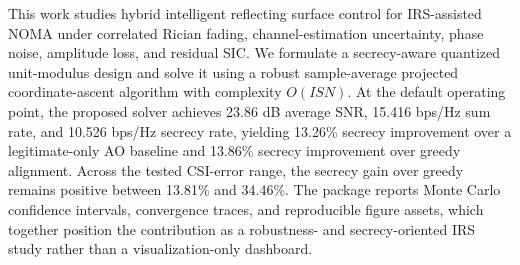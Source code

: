 This work studies hybrid intelligent reflecting surface control for IRS-assisted NOMA under correlated Rician fading, channel-estimation uncertainty, phase noise, amplitude loss, and residual SIC. We formulate a secrecy-aware quantized unit-modulus design and solve it using a robust sample-average projected coordinate-ascent algorithm with complexity $O(ISN)$. At the default operating point, the proposed solver achieves 23.86 dB average SNR, 15.416 bps/Hz sum rate, and 10.526 bps/Hz secrecy rate, yielding 13.26\% secrecy improvement over a legitimate-only AO baseline and 13.86\% secrecy improvement over greedy alignment. Across the tested CSI-error range, the secrecy gain over greedy remains positive between 13.81\% and 34.46\%. The package reports Monte Carlo confidence intervals, convergence traces, and reproducible figure assets, which together position the contribution as a robustness- and secrecy-oriented IRS study rather than a visualization-only dashboard.
